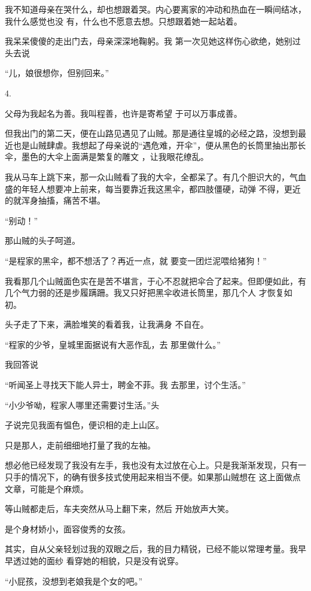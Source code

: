 \documentclass{article}
\begin{document}
我不知道母亲在哭什么，却也想跟着哭。内心要离家的冲动和热血在一瞬间结冰，我什么感觉也没
有，什么也不愿意去想。只想跟着她一起站着。 

我呆呆傻傻的走出门去，母亲深深地鞠躬。我
第一次见她这样伤心欲绝，她别过头去说 


\newpage

“儿，娘很想你，但别回来。” 


4. 

父母为我起名为善。我叫程善，也许是寄希望
于可以万事成善。 

但我出门的第二天，便在山路见遇见了山贼。那是通往皇城的必经之路，没想到最近也是山贼肆虐。我想起了母亲说的“遇危难，开伞”，便从黑色的长筒里抽出那长伞，墨色的大伞上面满是繁复的雕文
，让我眼花缭乱。 

我从马车上跳下来，那一众山贼看了我的大伞，全都呆了。有几个胆识大的，气血盛的年轻人想要冲上前来，每当要靠近我这黑伞，都四肢僵硬，动弹
不得，更近的就浑身抽搐，痛苦不堪。 


“别动！” 


那山贼的头子呵道。 

\newpage

“是程家的黑伞，都不想活了？再近一点，就
要变一团烂泥喂给猪狗！” 

我看那几个山贼面色实在是苦不堪言，于心不忍就把伞合了起来。但即便如此，有几个气力弱的还是步履蹒跚。我又只好把黑伞收进长筒里，那几个人
才恢复如初。 

头子走了下来，满脸堆笑的看着我，让我满身
不自在。 

“程家的少爷，皇城里面据说有大恶作乱，去
那里做什么。” 


我回答说 

“听闻圣上寻找天下能人异士，聘金不菲。我
去那里，讨个生活。” 

“小少爷呦，程家人哪里还需要讨生活。”头

\newpage
子说完见我面有愠色，便识相的走上山区。 


只是那人，走前细细地打量了我的左袖。 

想必他已经发现了我没有左手，我也没有太过放在心上。只是我渐渐发现，只有一只手的情况下，的确有很多技式使用起来相当不便。如果那山贼想在
这上面做点文章，可能是个麻烦。 

等山贼都走后，车夫突然从马上翻下来，然后
开始放声大笑。 


是个身材娇小，面容俊秀的女孩。 

其实，自从父亲轻划过我的双眼之后，我的目力精锐，已经不能以常理考量。我早早透过她的面纱
看穿她的相貌，只是没有说穿。 


“小屁孩，没想到老娘我是个女的吧。” 
\end{document}
